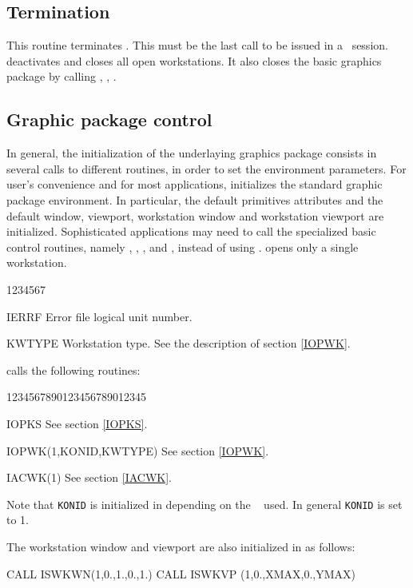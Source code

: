 \subsection{Termination}
\Action
This routine terminates \HIGZ. This must be the last call to be issued in a
\HIGZ~session.  deactivates and closes all open workstations.
It also closes the basic graphics package by calling , ,
.
 
\subsection{Graphic package control}
\Action
In general, the initialization of the underlaying graphics package consists in
several calls to different routines, in order to set the environment parameters.
For user's convenience and for most applications,  initializes the
standard graphic package environment. In particular, the default primitives
attributes and the default window, viewport, workstation window and workstation
viewport are initialized. Sophisticated applications may need to call the
specialized basic control routines, namely , ,
,  and , instead of using .
 opens only a single workstation.
\Pdesc
\begin{DLtt}{1234567}
\item[IERRF] Error file logical unit number.
\item[KWTYPE] Workstation type. See the description of  section
\ref{IOPWK}.
\end{DLtt}
\par
{} calls the following routines:
\begin{DLtt}{1234567890123456789012345}
\item[IOPKS] See section \ref{IOPKS}.
\item[IOPWK(1,KONID,KWTYPE)] See section \ref{IOPWK}.
\item[IACWK(1)] See section \ref{IACWK}.
\end{DLtt}
Note that {\tt KONID} is initialized in  depending on the \UGP~
used. In general {\tt KONID} is set to 1.
\par
The workstation window and viewport are also initialized in
 as follows:
\begin{XMP}
     CALL ISWKWN(1,0.,1.,0.,1.)
     CALL ISWKVP (1,0.,XMAX,0.,YMAX)
\end{XMP}
